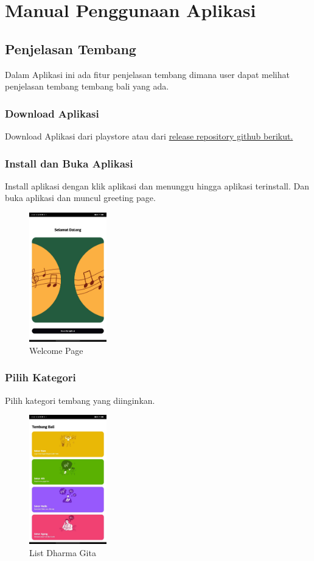 \section{Manual Penggunaan Aplikasi}

\subsection{Penjelasan Tembang}
Dalam Aplikasi ini ada fitur penjelasan tembang dimana user dapat melihat penjelasan tembang tembang bali yang ada.
\subsubsection{Download Aplikasi}
Download Aplikasi dari playstore atau dari \href{https://github.com/rahdeva/tembang_bali}{release repository github berikut.} 

\subsubsection{Install dan Buka Aplikasi}
Install aplikasi dengan klik aplikasi dan menunggu hingga aplikasi terinstall. Dan buka aplikasi dan muncul greeting page.

\begin{figure}[H]
    \centering
    \includegraphics[width=0.3\textwidth]{assets/welcome.jpg}
    \caption{Welcome Page}
\end{figure}

\subsubsection{Pilih Kategori}
Pilih kategori tembang yang diinginkan.

\begin{figure}[H]
    \centering
    \includegraphics[width=0.3\textwidth]{assets/list-gita.jpg}
    \caption{List Dharma Gita}
\end{figure}

